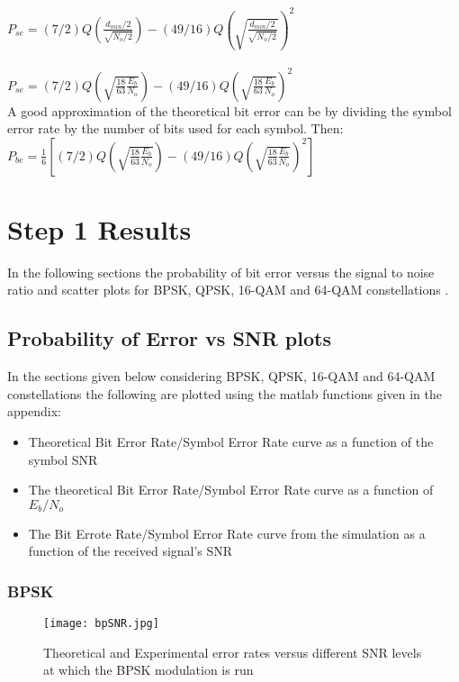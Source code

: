 \documentclass[]{article}
\begin{document}
$P_{se} = (7/2)Q\left(\frac{d_{min}/2}{\sqrt{N_o/2}}\right) -(49/16)Q\left(\sqrt{\frac{d_{min}/2}{\sqrt{N_o/2}}}\right)^2$ \\ \\

$P_{se} = (7/2)Q\left(\sqrt{\frac{18}{63}\frac{E_b}{N_o}}\right)-(49/16)Q\left(\sqrt{\frac{18}{63}\frac{E_b}{N_o}}\right)^2$ \\

A good approximation of the theoretical bit error can be by dividing the symbol error rate by the number of bits used for each symbol. Then:\\

$P_{be} = \frac{1}{6}\left[(7/2)Q\left(\sqrt{\frac{18}{63}\frac{E_b}{N_o}}\right)-(49/16)Q\left(\sqrt{\frac{18}{63}\frac{E_b}{N_o}}\right)^2\right]$ \\

\section{Step 1 Results}

In the following sections the probability of bit error versus the signal to noise ratio and scatter plots for BPSK, QPSK, 16-QAM and 64-QAM constellations .

\subsection{Probability of Error vs SNR plots}
In the sections given below considering BPSK, QPSK, 16-QAM and 64-QAM constellations the following  are plotted using the matlab functions given in the appendix:
\begin{itemize}
\item Theoretical Bit Error Rate/Symbol Error Rate curve as a function of the symbol SNR
\item The theoretical Bit Error Rate/Symbol Error Rate curve as a function of $E_b/N_o$
\item The Bit Errote Rate/Symbol Error Rate curve from the simulation as a function of the received signal's SNR
\end{itemize}

\subsubsection{BPSK}
\begin{figure}[H]
\centering
\hspace*{-2cm}\texttt{[image: bpSNR.jpg]}
\caption{Theoretical and Experimental error rates versus different SNR levels at which the BPSK modulation is run }
\end{figure}
\end{document}

